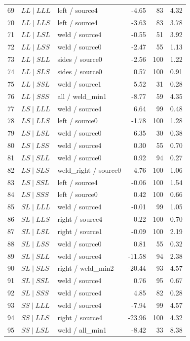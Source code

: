 \documentclass[11pt]{article}
\begin{document}
\begin{longtable}{@{}r>{\raggedright\arraybackslash}p{.28\linewidth}>{\raggedright\arraybackslash}p{.27\linewidth}rrr@{}}
69 & $LL\mid LLL$ & left / source4 & -4.65 & 83 & 4.32\\
70 & $LL\mid LLS$ & left / source4 & -3.63 & 83 & 3.78\\
71 & $LL\mid LSL$ & weld / source4 & -0.55 & 51 & 3.92\\
72 & $LL\mid LSS$ & weld / source0 & -2.47 & 55 & 1.13\\
73 & $LL\mid SLL$ & sides / source0 & -2.56 & 100 & 1.22\\
74 & $LL\mid SLS$ & sides / source0 & 0.57 & 100 & 0.91\\
75 & $LL\mid SSL$ & weld / source1 & 5.52 & 31 & 0.28\\
76 & $LL\mid SSS$ & all / weld\_\allowbreak min1 & -8.77 & 59 & 4.35\\
77 & $LS\mid LLL$ & weld / source4 & 6.64 & 99 & 0.48\\
78 & $LS\mid LLS$ & left / source0 & -1.78 & 100 & 1.28\\
79 & $LS\mid LSL$ & weld / source0 & 6.35 & 30 & 0.38\\
80 & $LS\mid LSS$ & weld / source4 & 0.30 & 55 & 0.70\\
81 & $LS\mid SLL$ & weld / source0 & 0.92 & 94 & 0.27\\
82 & $LS\mid SLS$ & weld\_\allowbreak right / source0 & -4.76 & 100 & 1.06\\
83 & $LS\mid SSL$ & left / source4 & -0.06 & 100 & 1.54\\
84 & $LS\mid SSS$ & left / source0 & 0.42 & 100 & 0.66\\
85 & $SL\mid LLL$ & weld / source4 & -0.01 & 99 & 1.05\\
86 & $SL\mid LLS$ & right / source4 & -0.22 & 100 & 0.70\\
87 & $SL\mid LSL$ & right / source1 & -0.09 & 100 & 2.19\\
88 & $SL\mid LSS$ & weld / source0 & 0.81 & 55 & 0.32\\
89 & $SL\mid SLL$ & weld / source4 & -11.58 & 94 & 2.38\\
90 & $SL\mid SLS$ & right / weld\_\allowbreak min2 & -20.44 & 93 & 4.57\\
91 & $SL\mid SSL$ & weld / source4 & 0.76 & 95 & 0.67\\
92 & $SL\mid SSS$ & weld / source4 & 4.85 & 82 & 0.28\\
93 & $SS\mid LLL$ & weld / source4 & -7.94 & 99 & 4.57\\
94 & $SS\mid LLS$ & right / source4 & -23.96 & 100 & 4.32\\
95 & $SS\mid LSL$ & weld / all\_\allowbreak min1 & -8.42 & 33 & 8.38\\

\end{longtable}
\end{document}
